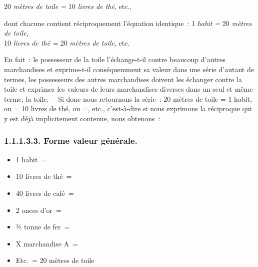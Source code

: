 \documentclass[french,twoside]{book} %
\begin{document}
20\emph{ mètres de toile =} 10\emph{ livres de thé}, etc.,\par
dont chacune contient réciproquement l’équation identique : 1\emph{ habit =} 20\emph{ mètres de toile}, \\
10\emph{ livres de thé =} 20\emph{ mètres de toile}, etc.\par
En fait : le possesseur de la toile l’échange-t-il contre beaucoup d’autres marchandises et exprime-t-il conséquemment sa valeur dans une série d’autant de termes, les possesseurs des autres marchandises doivent les échanger contre la toile et exprimer les valeurs de leurs marchandises diverses dans un seul et même terme, la toile. – Si donc nous retournons la série : 20 mètres de toile = 1 habit, ou = 10 livres de thé, ou =, etc., c’est-à-dire si nous exprimons la réciproque qui y est déjà implicitement contenue, nous obtenons :
\subsubsection[{1.1.1.3.3. Forme valeur générale.}]{1.1.1.3.3. Forme valeur générale.}

\begin{itemize}[itemsep=0pt,]
\item 1 habit =
\item 10 livres de thé =
\item 40 livres de café =
\item 2 onces d’or =
\item ½ tonne de fer =
\item X marchandise A =
\item Etc. = 20 mètres de toile
\end{itemize}
\end{document}
